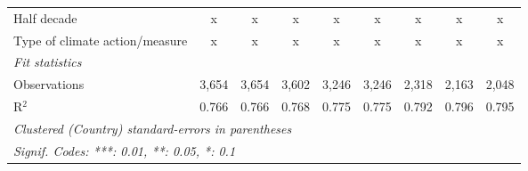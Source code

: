 \begin{tabular}{lcccccccc}
   Half decade                                                                 & x            & x            & x             & x             & x             & x              & x             & x\\  
   Type of climate action/measure                                              & x            & x            & x             & x             & x             & x              & x             & x\\  
   \midrule \emph{Fit statistics}\\
   Observations                                                                & 3,654        & 3,654        & 3,602         & 3,246         & 3,246         & 2,318          & 2,163         & 2,048\\  
   R$^2$                                                                       & 0.766        & 0.766        & 0.768         & 0.775         & 0.775         & 0.792          & 0.796         & 0.795\\  
   \midrule
   \multicolumn{9}{l}{\emph{Clustered (Country) standard-errors in parentheses}}\\
   \multicolumn{9}{l}{\emph{Signif. Codes: ***: 0.01, **: 0.05, *: 0.1}}\\
\end{tabular}
\par\endgroup


